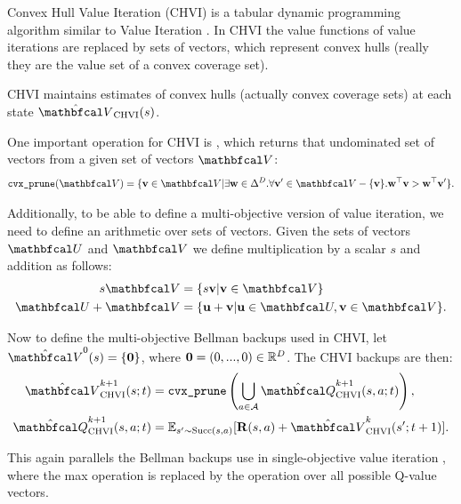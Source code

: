 
        Convex Hull Value Iteration (CHVI)  is a tabular dynamic programming algorithm similar to Value Iteration . In CHVI the value functions of value iterations are replaced by sets of vectors, which represent convex hulls (really they are the value set of a convex coverage set). 

        CHVI maintains estimates of convex hulls (actually convex coverage sets) at each state $\hat{\bfcl{V}}_{\chvi}(s)$.

        One important operation for CHVI is \cprune, which returns that undominated set of vectors from a given set of vectors $\bfcl{V}$:
        \begin{align}
            \cprune(\bfcl{V}) = \{\bff{v}\in\bfcl{V} | \exists \bff{w}\in\Delta^D. \forall \bff{v}'\in\bfcl{V}-\{\bff{v}\}. \bff{w}^\top \bff{v} > \bff{w}^\top \bff{v}' \}.
        \end{align}


        Additionally, to be able to define a multi-objective version of value iteration, we need to define an arithmetic over sets of vectors. Given the sets of vectors $\bfcl{U}$ and $\bfcl{V}$ we define multiplication by a scalar $s$ and addition as follows:
        \begin{align}
            s\bfcl{V} &= \{s\bff{v} | \bff{v}\in\bfcl{V} \} \\
            \bfcl{U} + \bfcl{V} &= \{ \bff{u}+\bff{v} | \bff{u}\in\bfcl{U}, \bff{v}\in\bfcl{V} \}.
        \end{align}

        Now to define the multi-objective Bellman backups used in CHVI, let $\hat{\bfcl{V}}^0(s) = \{ \bff{0} \}$, where $\mathbf{0}=(0,...,0)\in\mathbb{R}^D$. The CHVI backups are then:
        \begin{align}
            \Vchvi^{k+1}(s;t) &= \cprune \left( \bigcup_{a\in\cl{A}} \Qchvi^{k+1}(s,a;t) \right), \\
            \Qchvi^{k+1}(s,a;t) &= \bb{E}_{s'\sim \suc{s}{a}} [\bff{R}(s,a) + \Vchvi^k(s';t+1)].
        \end{align}
        
        This again parallels the Bellman backups use in single-objective value iteration , where the max operation is replaced by the \cprune operation over all possible Q-value vectors.  

